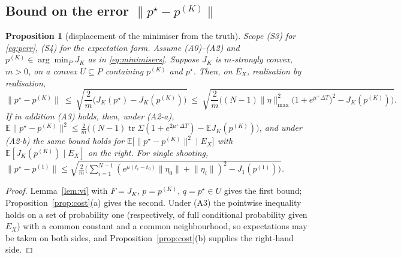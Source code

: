 \documentclass[11pt]{article}
\newtheorem{proposition}{Proposition}
\theoremstyle{remark}\newtheorem{remark}{Remark}
\newcommand{\pstar}{p^\star}
\newcommand{\norm}[1]{\lVert #1\rVert}
\begin{document}
\subsection{Bound on the error $\norm{\pstar-p^{(K)}}$}\label{sec:perr}
\begin{proposition}[displacement of the minimiser from the truth]\label{prop:perr}
\emph{Scope (S3) for \eqref{eq:perr}, (S4) for the expectation form.} Assume (A0)--(A2) and $p^{(K)}\in\arg\min_{P}J_K$ as in \eqref{eq:minimisers}. Suppose $J_K$ is $m$-strongly convex, $m>0$, on a convex $U\subseteq P$ containing $p^{(K)}$ \emph{and} $\pstar$. Then, on $E_X$, realisation by realisation,
\begin{equation}
\norm{\pstar-p^{(K)}}\ \le\ \sqrt{\frac2m\Big(J_K(\pstar)-J_K(p^{(K)})\Big)}
\ \le\ \sqrt{\frac2m\Big((N-1)\norm\eta_{\max}^2\big(1+e^{\mu^{+}\Delta T}\big)^2-J_K(p^{(K)})\Big)}.
\label{eq:perr}
\end{equation}
If in addition (A3) holds, then, under (A2-a), $\mathbb E\norm{\pstar-p^{(K)}}^2\le\tfrac2m\big((N-1)\operatorname{tr}\Sigma(1+e^{2\mu^{+}\Delta T})-\mathbb E J_K(p^{(K)})\big)$, and under (A2-b) the same bound holds for $\mathbb E\big[\norm{\pstar-p^{(K)}}^2\mid E_X\big]$ with $\mathbb E[J_K(p^{(K)})\mid E_X]$ on the right. For single shooting, $\norm{\pstar-p^{(1)}}\le\sqrt{\tfrac2m\big(\sum_{i=1}^{N-1}(e^{\mu(t_i-t_0)}\norm{\eta_0}+\norm{\eta_i})^2-J_1(p^{(1)})\big)}$.
\end{proposition}
\begin{proof}
Lemma~\ref{lem:vi} with $F=J_K$, $p=p^{(K)}$, $q=\pstar\in U$ gives the first bound; Proposition~\ref{prop:cost}(a) gives the second. Under (A3) the pointwise inequality holds on a set of probability one (respectively, of full conditional probability given $E_X$) with a common constant and a common neighbourhood, so expectations may be taken on both sides, and Proposition~\ref{prop:cost}(b) supplies the right-hand side.
\end{proof}
\end{document}
